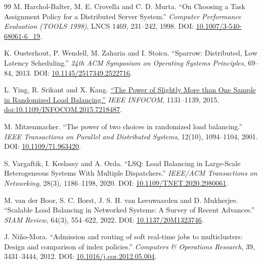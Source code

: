 \documentclass[12pt,a4paper]{article}
\begin{document}
\begin{thebibliography}{99}
 M. Harchol-Balter, M. E. Crovella and C. D. Murta. ``On Choosing a Task Assignment Policy for a Distributed Server System.'' \emph{Computer Performance Evaluation (TOOLS 1998)}, LNCS 1469, 231--242, 1998. DOI: \href{\detokenize{https://www.cs.cmu.edu/~harchol/Papers/tools.pdf}}{10.1007/3-540-68061-6\_19}.

 K. Ousterhout, P. Wendell, M. Zaharia and I. Stoica. ``Sparrow: Distributed, Low Latency Scheduling.'' \emph{24th ACM Symposium on Operating Systems Principles}, 69--84, 2013. DOI: \href{\detokenize{https://sigops.org/s/conferences/sosp/2013/papers/p69-ousterhout.pdf}}{10.1145/2517349.2522716}.

 L. Ying, R. Srikant and X. Kang. \href{\detokenize{https://bpb-us-w2.wpmucdn.com/sites.coecis.cornell.edu/dist/9/287/files/2019/08/Srikant-1-YinSriKan14tech.pdf}}{``The Power of Slightly More than One Sample in Randomized Load Balancing.''} \emph{IEEE INFOCOM}, 1131--1139, 2015. \href{\detokenize{https://doi.org/10.1109/INFOCOM.2015.7218487}}{doi:10.1109/INFOCOM.2015.7218487}.

 M. Mitzenmacher. ``The power of two choices in randomized load balancing.'' \emph{IEEE Transactions on Parallel and Distributed Systems}, 12(10), 1094--1104, 2001. DOI: \href{\detokenize{https://doi.org/10.1109/71.963420}}{10.1109/71.963420}.

 S. Vargaftik, I. Keslassy and A. Orda. ``LSQ: Load Balancing in Large-Scale Heterogeneous Systems With Multiple Dispatchers.'' \emph{IEEE/ACM Transactions on Networking}, 28(3), 1186--1198, 2020. DOI: \href{\detokenize{https://webee.technion.ac.il/~isaac/p/ton20_lsq.pdf}}{10.1109/TNET.2020.2980061}.

 M. van der Boor, S. C. Borst, J. S. H. van Leeuwaarden and D. Mukherjee. ``Scalable Load Balancing in Networked Systems: A Survey of Recent Advances.'' \emph{SIAM Review}, 64(3), 554--622, 2022. DOI: \href{\detokenize{https://doi.org/10.1137/20M1323746}}{10.1137/20M1323746}.

 J. Niño-Mora. ``Admission and routing of soft real-time jobs to multiclusters: Design and comparison of index policies.'' \emph{Computers \& Operations Research}, 39, 3431--3444, 2012. DOI: \href{\detokenize{https://arxiv.org/abs/2207.12815}}{10.1016/j.cor.2012.05.004}.


\end{thebibliography}
\end{document}
